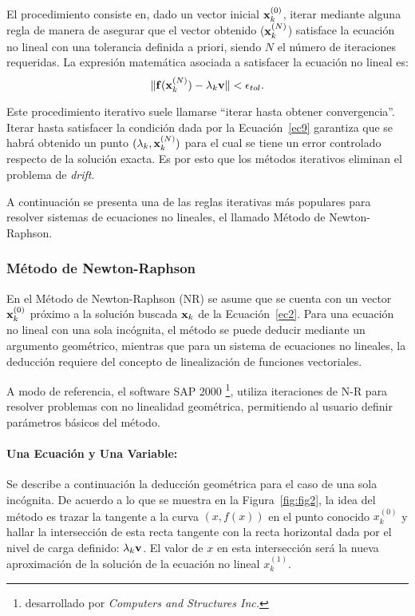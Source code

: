 El procedimiento consiste en, dado un vector inicial ${\bf x}_k^{(0)}$, iterar mediante alguna regla de manera de asegurar que el vector obtenido (${\bf x}_k^{(N)}$) satisface la ecuación no lineal con una tolerancia definida a priori, siendo $N$ el número de iteraciones requeridas. %
%
La expresión matemática asociada a satisfacer la ecuación no lineal es:
%
\begin{equation}\label{ec9}
	\| {\bf f}({\bf x}_k^{(N)}) - \lambda_k {\bf v} \| < \epsilon_{tol}.
\end{equation}

Este procedimiento iterativo suele llamarse ``iterar hasta obtener convergencia''. %
%
Iterar hasta satisfacer la condición dada por la Ecuación~\eqref{ec9} garantiza que se habrá obtenido un punto $(\lambda_k,{\bf x}_k^{(N)})$ para el cual se tiene un error controlado respecto de la solución exacta. Es por esto que los métodos iterativos eliminan el problema de \textit{drift}.



A continuación se presenta una de las reglas iterativas más populares para resolver sistemas de ecuaciones no lineales, el llamado Método de Newton-Raphson.

\subsubsection{Método de Newton-Raphson} \label{sec:NRcap1}

En el Método de Newton-Raphson (NR) se asume que se cuenta con un vector ${\bf x}_k^{(0)}$ próximo a la solución buscada ${\bf x}_k$ de la Ecuación~\eqref{ec2}. Para una ecuación no lineal con una sola incógnita, el método se puede deducir mediante un argumento geométrico, mientras que para un sistema de ecuaciones no lineales, la deducción requiere del concepto de linealización de funciones vectoriales.

A modo de referencia, el software SAP 2000\textsuperscript{\textregistered} \footnote{desarrollado por \textit{Computers and Structures Inc.}}, utiliza iteraciones de N-R para resolver problemas con no linealidad geométrica, permitiendo al usuario definir parámetros básicos del método.


\paragraph{Una Ecuación y Una Variable:} %
%
Se describe a continuación la deducción geométrica para el caso de una sola incógnita. De acuerdo a lo que se muestra en la Figura~\ref{fig:fig2}, la idea del método es trazar la tangente a la curva $(x,f(x))$ en el punto conocido $x_k^{(0)}$ y hallar la intersección de esta recta tangente con la recta horizontal dada por el nivel de carga definido: $\lambda_k {\bf v}$. %
%
El valor de $x$ en esta intersección será la nueva aproximación de la solución de la ecuación no lineal $x_k^{(1)}$.

